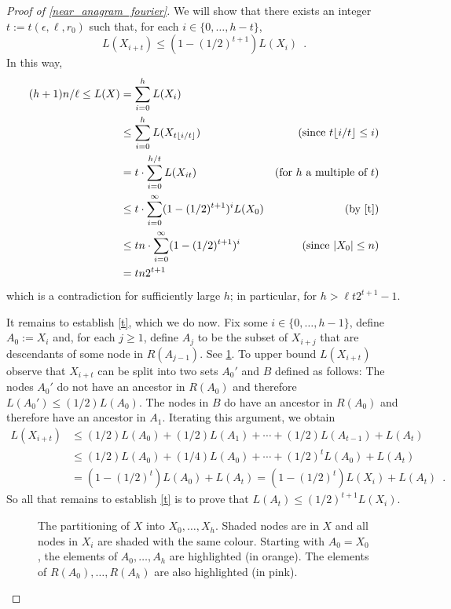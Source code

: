 \documentclass{patmorin}
\begin{document}
\begin{proof}[Proof of \cref{near_anagram_fourier}]
  We will show that there exists an integer $t:=t(\epsilon,\ell,r_0)$ such that, for each $i\in\{0,\ldots,h-t\}$,
  \begin{equation}
     L(X_{i+t}) \le (1-(1/2)^{t+1}) L(X_i) \enspace . \label{t}
  \end{equation}
  In this way,
  \begin{align*}
     (h+1)n/\ell
        \le L(X) & = \sum_{i=0}^{h} L(X_i) \\
           &\le \sum_{i=0}^{h} L(X_{t\floor{i/t}})
             & \text{(since $t\floor{i/t}\le i$)} \\
           & = t\cdot\sum_{i=0}^{h/t} L(X_{it})
             & \text{(for $h$ a multiple of $t$)} \\
           &\le t\cdot\sum_{i=0}^{\infty} (1-(1/2)^{t+1})^i L(X_0)
           & \text{(by \cref{t})}\\
           &\le tn\cdot \sum_{i=0}^{\infty} (1-(1/2)^{t+1})^i
           & \text{(since $|X_0|\le n$)} \\
           & = tn2^{t+1} \\
  \end{align*}
  which is a contradiction for sufficiently large $h$; in particular, for $h > \ell t2^{t+1}-1$.

  It remains to establish \cref{t}, which we do now.  Fix some $i\in\{0,\ldots,h-1\}$, define $A_0:= X_i$ and, for each $j\ge 1$, define $A_j$ to be the subset of $X_{i+j}$ that are descendants of some node in $R(A_{j-1})$.  See \cref{bigtree}.  To upper bound $L(X_{i+t})$ observe that $X_{i+t}$ can be split into two sets $A_0'$ and $B$ defined as follows:  The nodes $A_0'$ do not have an ancestor in $R(A_0)$ and therefore $L(A_0')\le (1/2)L(A_0)$. The nodes in $B$ do have an ancestor in $R(A_0)$ and therefore have an ancestor in $A_1$.  Iterating this argument, we obtain
 \begin{align*}
      L(X_{i+t})
         &\le (1/2)L(A_0) + (1/2)L(A_1) + \cdots + (1/2)L(A_{t-1}) + L(A_t) \\
         &\le (1/2)L(A_0) + (1/4)L(A_0) + \cdots + (1/2)^t L(A_{0}) + L(A_t) \\
         &  = (1-(1/2)^t)L(A_0) + L(A_t) = (1-(1/2)^t)L(X_i) + L(A_t)  \enspace .
   \end{align*}
  So all that remains to establish \ref{t} is to prove that
  $L(A_t)\le (1/2)^{t+1}L(X_i)$.

  \begin{figure}
    \caption{The partitioning of $X$ into $X_0,\ldots,X_h$. Shaded
    nodes are in $X$ and all nodes in $X_i$ are shaded with the same
    colour.   Starting with $A_0=X_0$, the elements of $A_0,\ldots,A_h$
    are highlighted (in orange).  The elements of $R(A_0),\ldots,R(A_h)$ are also highlighted (in pink).}
    \label{bigtree}
  \end{figure}


\end{proof}
\end{document}
